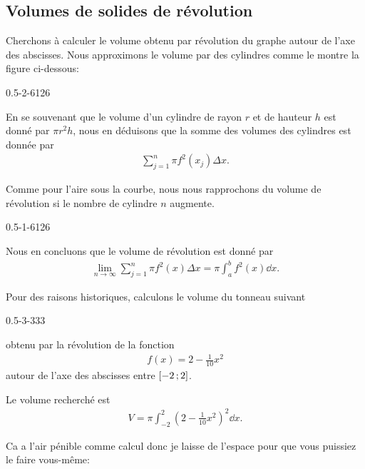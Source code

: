 \documentclass[main.tex]{subfiles}
\begin{document}
\subsection{Volumes de solides de révolution}

Cherchons à calculer le volume obtenu par révolution du graphe autour de l'axe des abscisses.
Nous approximons le volume par des cylindres comme le montre la figure ci-dessous:
\begin{plot}
    {0.5}{-2}{-6}{12}{6}
\end{plot}

En se souvenant que le volume d'un cylindre de rayon $r$ et de hauteur $h$ est donné par $\pi r^2 h$,
nous en déduisons que la somme des volumes des cylindres est donnée par
\begin{align}
    \sum_{j = 1}^n \pi f^2(x_j) \Delta x.
\end{align}

Comme pour l'aire sous la courbe,
nous nous rapprochons du volume de révolution si le nombre de cylindre $n$ augmente.
\begin{plot}
    {0.5}{-1}{-6}{12}{6}
\end{plot}

Nous en concluons que le volume de révolution est donné par
\begin{align}
    \lim_{n \to \infty} \sum_{j = 1}^n \pi f^2(x) \Delta x
    = \pi \int_a^b f^2(x) \dd x.
\end{align}

\begin{example}

    Pour des raisons historiques,
    calculons le volume du tonneau suivant
    \begin{plot}
        {0.5}{-3}{-3}{3}{3}
    \end{plot}
    obtenu par la révolution de la fonction
    \begin{align}
        f(x) = 2 -\frac 1 {10} x^2
    \end{align}
    autour de l'axe des abscisses entre $\mathopen{[}-2\,;2\mathclose{]}$.

    Le volume recherché est
    \begin{align}
        V = \pi \int_{-2}^2 \left(2 - \frac 1 {10} x^2\right)^2 \dd x.
    \end{align}

    Ca a l'air pénible comme calcul donc je laisse de l'espace pour que vous puissiez le faire vous-même:

    \vspace{10cm}
\end{example}
\end{document}
